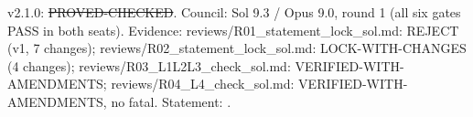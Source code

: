 \begin{theorem}\label{reg:W2-FAC-B_Thm-FAC-CS}
\end{theorem}
\begin{statusbox}
 v2.1.0: \st{PROVED-CHECKED}. Council: Sol 9.3 / Opus 9.0, round 1 (all six gates PASS in both seats). Evidence: reviews/R01\_statement\_lock\_sol.md: REJECT (v1, 7 changes); reviews/R02\_statement\_lock\_sol.md: LOCK-WITH-CHANGES (4 changes); reviews/R03\_L1L2L3\_check\_sol.md: VERIFIED-WITH-AMENDMENTS; reviews/R04\_L4\_check\_sol.md: VERIFIED-WITH-AMENDMENTS, no fatal. Statement: .
\end{statusbox}
